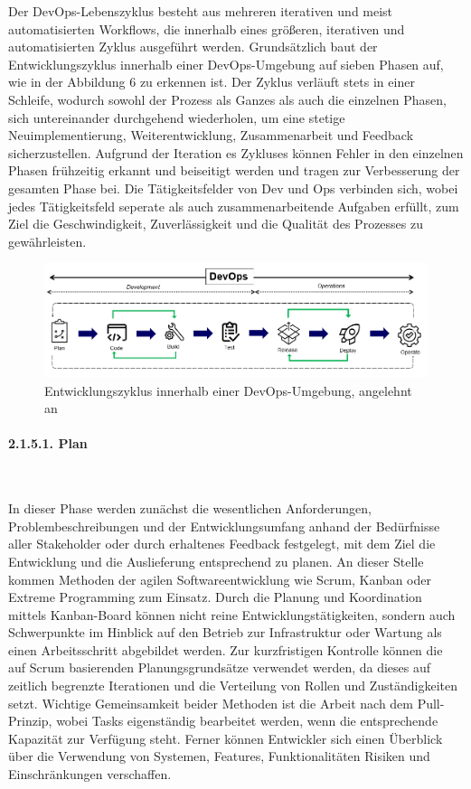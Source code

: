 Der DevOps-Lebenszyklus besteht aus mehreren iterativen und meist automatisierten Workflows, die innerhalb eines größeren, iterativen und automatisierten Zyklus ausgeführt werden. \cite[S. 16]{halstenberg_devops_2020} Grundsätzlich baut der Entwicklungszyklus innerhalb einer DevOps-Umgebung auf sieben Phasen auf, wie in der Abbildung 6 zu erkennen ist. Der Zyklus verläuft stets in einer Schleife, wodurch sowohl der Prozess als Ganzes als auch die einzelnen Phasen, sich untereinander durchgehend wiederholen, um eine stetige Neuimplementierung, Weiterentwicklung, Zusammenarbeit und Feedback sicherzustellen. Aufgrund der Iteration es Zykluses können Fehler in den einzelnen Phasen frühzeitig erkannt und beiseitigt werden und tragen zur Verbesserung der gesamten Phase bei. Die Tätigkeitsfelder von Dev und Ops verbinden sich, wobei jedes Tätigkeitsfeld seperate als auch zusammenarbeitende Aufgaben erfüllt, zum Ziel die Geschwindigkeit, Zuverlässigkeit und die Qualität des Prozesses zu gewährleisten. 

\begin{figure}[h]
    \centering
    \includegraphics[scale=0.6]{Bilder/DevOps Lebenszyklus.png}
    \caption{Entwicklungszyklus innerhalb einer DevOps-Umgebung, angelehnt an \cite[S. 16]{halstenberg_devops_2020}}
\end{figure}

\paragraph{2.1.5.1. Plan}$~$

In dieser Phase werden zunächst die wesentlichen Anforderungen, Problembeschreibungen und der Entwicklungsumfang anhand der Bedürfnisse aller Stakeholder oder durch erhaltenes Feedback festgelegt, mit dem Ziel die Entwicklung und die Auslieferung entsprechend zu planen. \cite[s. 16]{halstenberg_devops_2020} An dieser Stelle kommen Methoden der agilen Softwareentwicklung wie Scrum, Kanban oder Extreme Programming zum Einsatz. Durch die Planung und Koordination mittels Kanban-Board können nicht reine Entwicklungstätigkeiten, sondern auch Schwerpunkte im Hinblick auf den Betrieb zur Infrastruktur oder Wartung als einen Arbeitsschritt abgebildet werden. \cite{schaefer_devops_2017} Zur kurzfristigen Kontrolle können die auf Scrum basierenden Planungsgrundsätze verwendet werden, da dieses auf zeitlich begrenzte Iterationen und die Verteilung von Rollen und Zuständigkeiten setzt. Wichtige Gemeinsamkeit beider Methoden ist die Arbeit nach dem Pull-Prinzip, wobei Tasks eigenständig bearbeitet werden, wenn die entsprechende Kapazität zur Verfügung steht. \cite{concas_agile_2007} Ferner können Entwickler sich einen Überblick über die Verwendung von Systemen, Features, Funktionalitäten Risiken und Einschränkungen verschaffen. \cite{yarlagadda_devops_2021} 

